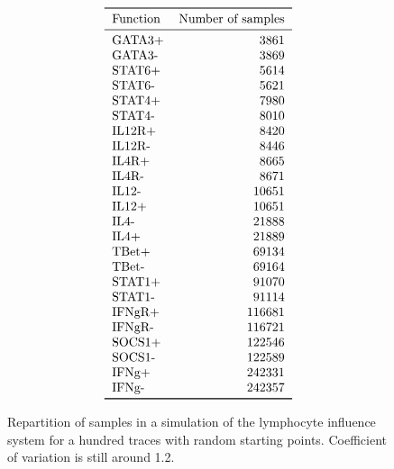\documentclass{llncs}
\begin{document}
\begin{figure}[htbp]
	\[
\begin{tabular}{lr}
\toprule
Function &  Number of samples\\
\midrule
GATA3+   &    3861 \\
GATA3-   &    3869 \\
STAT6+   &    5614 \\
STAT6-   &    5621 \\
STAT4+   &    7980 \\
STAT4-   &    8010 \\
IL12R+   &    8420 \\
IL12R-   &    8446 \\
IL4R+    &    8665 \\
IL4R-    &    8671 \\
IL12-    &   10651 \\
IL12+    &   10651 \\
IL4-     &   21888 \\
IL4+     &   21889 \\
TBet+    &   69134 \\
TBet-    &   69164 \\
STAT1+   &   91070 \\
STAT1-   &   91114 \\
IFNgR+   &  116681 \\
IFNgR-   &  116721 \\
SOCS1+   &  122546 \\
SOCS1-   &  122589 \\
IFNg+    &  242331 \\
IFNg-    &  242357 \\
\bottomrule
\end{tabular}
	\]
	\caption{Repartition of samples in a simulation of the lymphocyte influence system for a hundred traces with random starting points. Coefficient of variation is still around 1.2.\label{nsample-tab2}}
\end{figure}

\begin{listfig}[htb]
	
	\caption{Results of PAC learning on 140 simulation of the lymphocyte influence system, with random starting points.\label{lympho-rand.res}}
\end{listfig}
\end{document}
